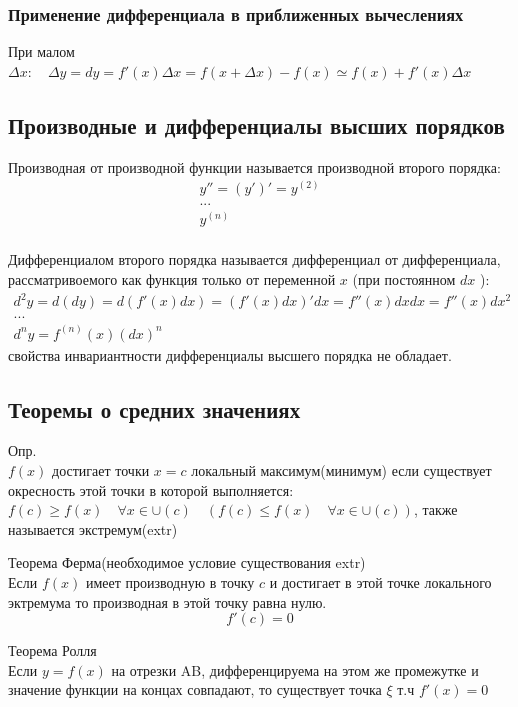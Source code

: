 \documentclass[a4paper, 12pt]{article}
\begin{document}
\subsubsection{Применение дифференциала в приближенных вычеслениях}

При малом $ \Delta x: \quad \Delta y = dy = f'(x)\Delta x = f(x + \Delta x) - f(x) \simeq f(x) + f'(x)\Delta x $ \\

\subsection{Производные и дифференциалы высших порядков}
Производная от производной функции называется производной второго порядка:\\
\begin{align*}
   y'' = (y')' = y^{(2)}  \\
 ...\\
   y^{(n)} \\
\end{align*}


Дифференциалом второго порядка называется дифференциал от дифференциала, рассматривоемого как функция только от переменной $ x $ (при постоянном $ dx $ ):\\
\begin{align*}
       d^2y = d(dy) = d(f'(x)dx)=(f'(x)dx)'dx=f''(x) dxdx=f''(x) dx^2 \\
      ...\\
       d^ny = f^{(n)}(x) (dx)^{n} 
    \end{align*}
свойства инвариантности дифференциалы высшего порядка не обладает.\\

\subsection{Теоремы о средних значениях}

Опр.\\
$ f(x) $ достигает точки $ x = c $ локальный максимум(минимум) если существует окресность этой точки в которой выполняется: $ f(c) \geq f(x) \quad \forall x \in \cup(c)\quad (f(c) \leq f(x) \quad \forall x \in \cup(c))$, также называется экстремум(extr)\\
\newpage
\begin{mdframed}[backgroundcolor=blue!20] 
       Теорема Ферма(необходимое условие существования extr)\\
       Если $ f(x) $ имеет производную в точку $ c $ и достигает в этой точке локального эктремума то производная в этой точку равна нулю.\[
         f'(c) = 0
       \] 

       Теорема Ролля\\
       Если $ y = f(x) $ на отрезки AB, дифференцируема на этом же промежутке и значение функции на концах совпадают, то существует точка $ \xi  $ т.ч $ f'(x) = 0 $   


    \end{mdframed}
\end{document}
